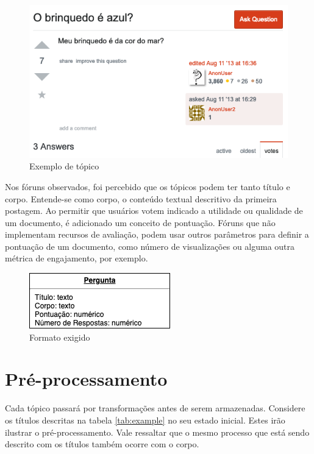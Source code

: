 \begin{figure}[htb]
	\centering
	\includegraphics[width=\textwidth]{chapters/project/question-brinquedo.png}
	\caption{Exemplo de tópico}
	\label{fig:screenshootquestion}
\end{figure}
Nos fóruns observados, foi percebido que os tópicos podem ter tanto título e corpo. Entende-se como corpo, o conteúdo textual descritivo da primeira postagem. Ao permitir que usuários votem indicado a utilidade ou qualidade de um documento, é adicionado um conceito de pontuação. Fóruns que não implementam recursos de avaliação, podem usar outros parâmetros para definir a pontuação de um documento, como número de visualizações ou alguma outra métrica de engajamento, por exemplo.

\begin{figure}[htb]
	\centering
	\includegraphics[scale=1.0]{chapters/project/mer.png}
	\caption{Formato exigido}
\end{figure}

\section{Pré-processamento}
Cada tópico passará por transformações antes de serem armazenadas. Considere os títulos descritas na tabela \ref{tab:example} no seu estado inicial. Estes irão ilustrar o pré-processamento. Vale ressaltar que o mesmo processo que está sendo descrito com os títulos também ocorre com o corpo.

